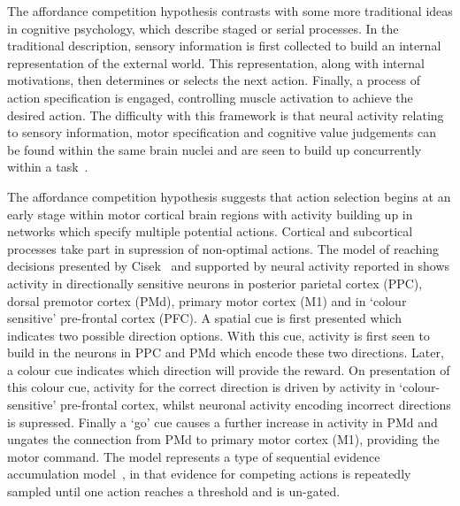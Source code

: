 \documentclass[10pt,letterpaper]{article}
\begin{document}
The affordance competition hypothesis contrasts with some more
traditional ideas in cognitive psychology, which describe staged or
serial processes. In the traditional description, sensory information
is first collected to build an internal representation of the external
world.  This representation, along with internal motivations, then
determines or selects the next action. Finally, a process of action
specification is engaged, controlling muscle activation to achieve the
desired action. The difficulty with this framework is that neural
activity relating to sensory information, motor specification and
cognitive value judgements can be found within the same brain nuclei
and are seen to build up concurrently within a
task~\cite{cisek_neural_2005,schall_neural_1993}.

The affordance competition hypothesis suggests that action selection
begins at an early stage within motor cortical brain regions with
activity building up in networks which specify multiple potential
actions. Cortical and subcortical~\cite{humphries_role_2002} processes
take part in supression of non-optimal actions. The model of reaching
decisions presented by
Cisek~\cite{cisek_cortical_2007,cisek_integrated_2006} and supported
by neural activity reported in \cite{cisek_neural_2005} shows activity
in directionally sensitive neurons in posterior parietal cortex (PPC),
dorsal premotor cortex (PMd), primary motor cortex (M1) and in `colour
sensitive' pre-frontal cortex (PFC). A spatial cue is first presented
which indicates two possible direction options. With this cue,
activity is first seen to build in the neurons in PPC and PMd which
encode these two directions. Later, a colour cue indicates which
direction will provide the reward. On presentation of this colour cue,
activity for the correct direction is driven by activity in
`colour-sensitive' pre-frontal cortex, whilst neuronal activity
encoding incorrect directions is supressed. Finally a `go' cue causes
a further increase in activity in PMd and ungates the connection from
PMd to primary motor cortex (M1), providing the motor command. The
model represents a type of sequential evidence accumulation
model~\cite{bogacz_physics_2006}, in that evidence for competing
actions is repeatedly sampled until one action reaches a threshold and
is un-gated.
\end{document}
